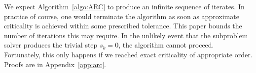 %

We expect Algorithm~\ref{algo:ARC} to produce an infinite sequence of iterates. In practice of course, one would terminate the algorithm as soon as approximate criticality is achieved within some prescribed tolerance. This paper bounds the number of iterations this may require. In the unlikely event that the subproblem solver produces the trivial step $s_k = 0$, the algorithm cannot proceed. Fortunately, this only happens if we reached exact criticality of appropriate order. Proofs are in Appendix~\ref{app:arc}.


